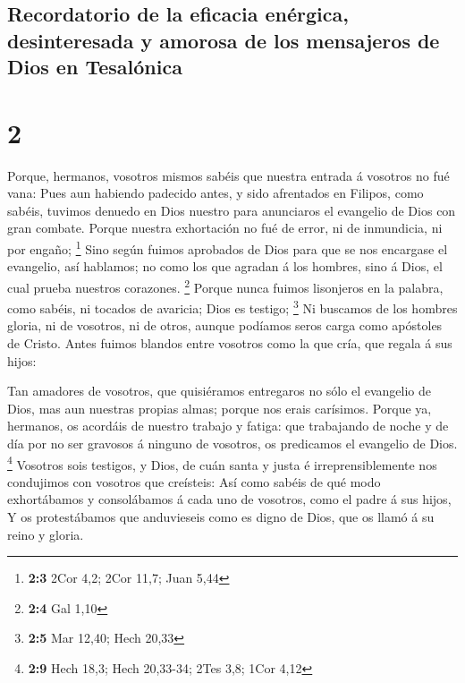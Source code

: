 \hypertarget{recordatorio-de-la-eficacia-enuxe9rgica-desinteresada-y-amorosa-de-los-mensajeros-de-dios-en-tesaluxf3nica}{%
\subsection{Recordatorio de la eficacia enérgica, desinteresada y
amorosa de los mensajeros de Dios en
Tesalónica}\label{recordatorio-de-la-eficacia-enuxe9rgica-desinteresada-y-amorosa-de-los-mensajeros-de-dios-en-tesaluxf3nica}}

\hypertarget{section-1}{%
\section{2}\label{section-1}}

 Porque, hermanos, vosotros mismos sabéis que nuestra
entrada á vosotros no fué vana:  Pues aun habiendo
padecido antes, y sido afrentados en Filipos, como sabéis, tuvimos
denuedo en Dios nuestro para anunciaros el evangelio de Dios con gran
combate.  Porque nuestra exhortación no fué de error, ni
de inmundicia, ni por engaño; \footnote{\textbf{2:3} 2Cor 4,2; 2Cor
  11,7; Juan 5,44}  Sino según fuimos aprobados de Dios
para que se nos encargase el evangelio, así hablamos; no como los que
agradan á los hombres, sino á Dios, el cual prueba nuestros corazones.
\footnote{\textbf{2:4} Gal 1,10}  Porque nunca fuimos
lisonjeros en la palabra, como sabéis, ni tocados de avaricia; Dios es
testigo; \footnote{\textbf{2:5} Mar 12,40; Hech 20,33}  Ni
buscamos de los hombres gloria, ni de vosotros, ni de otros, aunque
podíamos seros carga como apóstoles de Cristo.  Antes
fuimos blandos entre vosotros como la que cría, que regala á sus hijos:

 Tan amadores de vosotros, que quisiéramos entregaros no
sólo el evangelio de Dios, mas aun nuestras propias almas; porque nos
erais carísimos.  Porque ya, hermanos, os acordáis de
nuestro trabajo y fatiga: que trabajando de noche y de día por no ser
gravosos á ninguno de vosotros, os predicamos el evangelio de Dios.
\footnote{\textbf{2:9} Hech 18,3; Hech 20,33-34; 2Tes 3,8; 1Cor 4,12}
 Vosotros sois testigos, y Dios, de cuán santa y justa é
irreprensiblemente nos condujimos con vosotros que creísteis:
 Así como sabéis de qué modo exhortábamos y consolábamos
á cada uno de vosotros, como el padre á sus hijos,  Y os
protestábamos que anduvieseis como es digno de Dios, que os llamó á su
reino y gloria.

